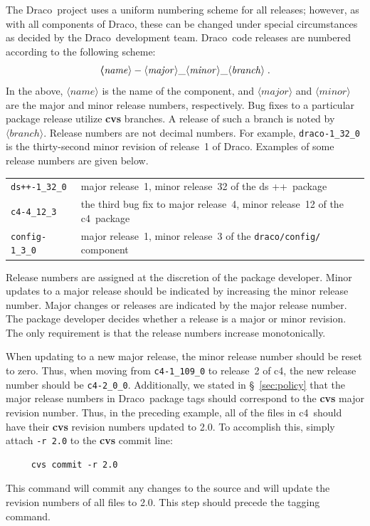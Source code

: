 \documentclass[11pt]{nmemo}
\newcommand{\draco}{{\normalfont\normalsize\sffamily Draco}}
\newcommand{\cfour}{{\normalfont\normalsize\sffamily c\footnotesize 4}}
\newcommand{\dsxx}{{\normalfont\normalsize\sffamily ds\raisebox{.2ex}
  {\scriptsize ++}}}
\begin{document}
The \draco\ project uses a uniform numbering scheme for all releases;
however, as with all components of \draco, these can be changed under
special circumstances as decided by the \draco\ development team.
\draco\ code releases are numbered according to the following scheme:
\begin{equation}
  \boldsymbol
  \langle\mathit{name}\rangle-
  \langle\mathit{major}\rangle\_
  \langle\mathit{minor}\rangle\_
  \langle\mathit{branch}\rangle\; .
  \notag
\end{equation}
In the above, $\langle\mathit{name}\rangle$ is the name of the
component, and $\langle\mathit{major}\rangle$ and
$\langle\mathit{minor}\rangle$ are the major and minor release
numbers, respectively. Bug fixes to a particular package release utilize
{\bf cvs} branches.  A release of such a branch is noted by
$\langle\mathit{branch}\rangle$.  Release numbers are not decimal
numbers.  For example, \texttt{draco-1\_32\_0} is the thirty-second
minor revision of release~1 of \draco.  Examples of some release
numbers are given below.
\begin{center}
  \begin{tabular}{ll}
    \texttt{ds++-1\_32\_0} & major release~1, minor release~32 of the
    \dsxx\ package \\
    \texttt{c4-4\_12\_3} & the third bug fix to major release~4, minor
    release~12 of the \cfour\ package \\
    \texttt{config-1\_3\_0} & major release~1, minor release~3 of the
    \texttt{draco/config/} component\\
  \end{tabular}
\end{center}

Release numbers are assigned at the discretion of the package
developer.  Minor updates to a major release should be indicated by
increasing the minor release number.  Major changes or releases are
indicated by the major release number.  The package developer decides
whether a release is a major or minor revision.  The only requirement
is that the release numbers increase monotonically. 

When updating to a new major release, the minor release number should
be reset to zero.  Thus, when moving from \texttt{c4-1\_109\_0} to
release~2 of \cfour, the new release number should be
\texttt{c4-2\_0\_0}.  Additionally, we stated in \S~\ref{sec:policy}
that the major release numbers in \draco\ package tags should
correspond to the {\bf cvs} major revision number.  Thus, in the
preceding example, all of the files in \cfour\ should have their {\bf
  cvs} revision numbers updated to 2.0.  To accomplish this, simply
attach \texttt{-r 2.0} to the {\bf cvs} commit line:
\begin{verbatim}
     cvs commit -r 2.0
\end{verbatim}
This command will commit any changes to the source and will update 
the revision numbers of all files to 2.0.  This step should precede
the tagging command.
\end{document}
